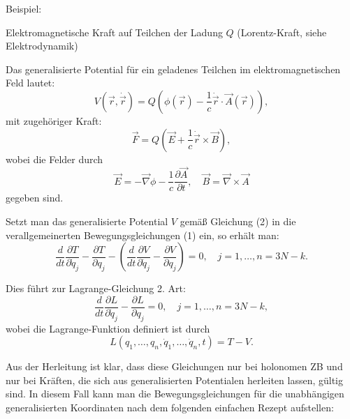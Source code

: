\documentclass[10pt, letterpaper]{article}
\begin{document}
Beispiel: 

Elektromagnetische Kraft auf Teilchen der Ladung $Q$ (Lorentz-Kraft, siehe Elektrodynamik)

Das generalisierte Potential für ein geladenes Teilchen im elektromagnetischen Feld lautet:
\[
V(\vec{r}, \dot{\vec{r}}) = Q \left( \phi(\vec{r}) - \frac{1}{c} \dot{\vec{r}} \cdot \vec{A}(\vec{r}) \right),
\]
mit zugehöriger Kraft:
\[
\vec{F} = Q \left( \vec{E} + \frac{1}{c} \dot{\vec{r}} \times \vec{B} \right),
\]
wobei die Felder durch
\[
\vec{E} = -\vec{\nabla} \phi - \frac{1}{c} \frac{\partial \vec{A}}{\partial t}, 
\quad 
\vec{B} = \vec{\nabla} \times \vec{A}
\]
gegeben sind.

\vspace{1em}

Setzt man das generalisierte Potential \( V \) gemäß Gleichung (2) in die verallgemeinerten Bewegungsgleichungen (1) ein, so erhält man:
\[
\frac{d}{dt} \frac{\partial T}{\partial \dot{q}_j} - \frac{\partial T}{\partial q_j} 
- \left( \frac{d}{dt} \frac{\partial V}{\partial \dot{q}_j} - \frac{\partial V}{\partial q_j} \right) = 0, 
\quad j = 1, \dotsc, n = 3N - k.
\]

Dies führt zur Lagrange-Gleichung 2. Art:
\begin{equation*}
\frac{d}{dt} \frac{\partial L}{\partial \dot{q}_j} - \frac{\partial L}{\partial q_j} = 0, 
\quad j = 1, \dotsc, n = 3N - k,
\end{equation*}
wobei die Lagrange-Funktion definiert ist durch
\[
L(q_1, \dotsc, q_n, \dot{q}_1, \dotsc, \dot{q}_n, t) = T - V.
\]



Aus der Herleitung ist klar, dass diese Gleichungen nur bei holonomen ZB und nur bei Kräften, die sich aus generalisierten Potentialen herleiten lassen, gültig sind. In diesem Fall kann man die Bewegungsgleichungen für die unabhängigen generalisierten Koordinaten nach dem folgenden einfachen Rezept aufstellen:
\end{document}
